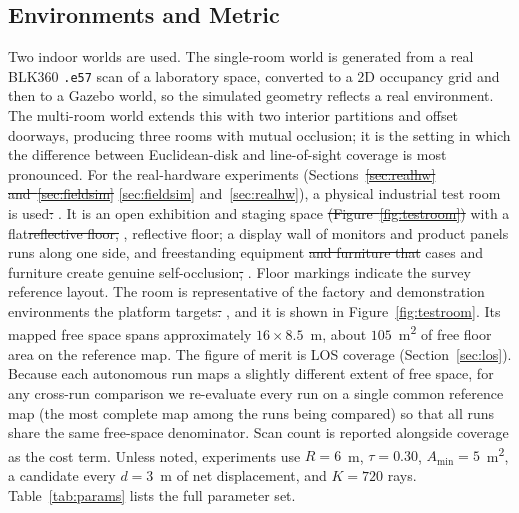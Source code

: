 \documentclass[sensors,article,submit,pdftex,moreauthors]{Definitions/mdpi}
\providecommand{\DIFadd}[1]{{\protect\color{blue} \sf #1}} %
\providecommand{\DIFdel}[1]{{\protect\color{red}\protect\scriptsize\protect\sout{#1}}} %
\providecommand{\DIFaddbegin}{} %
\providecommand{\DIFaddend}{} %
\providecommand{\DIFdelbegin}{} %
\providecommand{\DIFdelend}{} %
\begin{document}
\subsection{Environments and Metric}

Two indoor worlds are used. The single-room world is generated from a real
BLK360 \texttt{.e57} scan of a laboratory space, converted to a 2D occupancy
grid and then to a Gazebo world, so the simulated geometry reflects a real
environment. The multi-room world extends this with two interior partitions and
offset doorways, producing three rooms with mutual occlusion; it is the setting
in which the difference between Euclidean-disk and line-of-sight coverage is most
pronounced. For the real-hardware experiments (Sections~\DIFdelbegin \DIFdel{\ref{sec:realhw}
and~\ref{sec:fieldsim}}\DIFdelend \DIFaddbegin \DIFadd{\ref{sec:fieldsim}
and~\ref{sec:realhw}}\DIFaddend ), a physical industrial test room is used\DIFdelbegin \DIFdel{: }\DIFdelend \DIFaddbegin \DIFadd{. It is }\DIFaddend an open
exhibition and staging space \DIFdelbegin \DIFdel{(Figure~\ref{fig:testroom}) }\DIFdelend with a flat\DIFdelbegin \DIFdel{reflective floor, }\DIFdelend \DIFaddbegin \DIFadd{, reflective floor; }\DIFaddend a display wall \DIFaddbegin \DIFadd{of
monitors and product panels runs }\DIFaddend along one side, and freestanding equipment
\DIFdelbegin \DIFdel{and furniture that }\DIFdelend \DIFaddbegin \DIFadd{cases and furniture }\DIFaddend create genuine self-occlusion\DIFdelbegin \DIFdel{,
}\DIFdelend \DIFaddbegin \DIFadd{. Floor markings indicate the
survey reference layout. The room is }\DIFaddend representative of the factory and
demonstration environments the platform targets\DIFdelbegin \DIFdel{.
}\DIFdelend \DIFaddbegin \DIFadd{, and it is shown in
Figure~\ref{fig:testroom}. Its mapped free space spans approximately
$16\times8.5$~m, about $105$~m\textsuperscript{2} of free floor area on the
reference map.
}\DIFaddend The figure of merit is LOS coverage (Section~\ref{sec:los}). Because
each autonomous run maps a slightly different extent of free space, for any
cross-run comparison we re-evaluate every run on a single common reference map
(the most complete map among the runs being compared) so that all runs share the
same free-space denominator. Scan count is reported alongside coverage as the
cost term. Unless noted, experiments use $R=6$~m, $\tau=0.30$,
$A_{\min}=5$~m\textsuperscript{2}, a candidate every $d=3$~m of net displacement,
and $K=720$ rays. Table~\ref{tab:params} lists the full parameter set.
\end{document}
